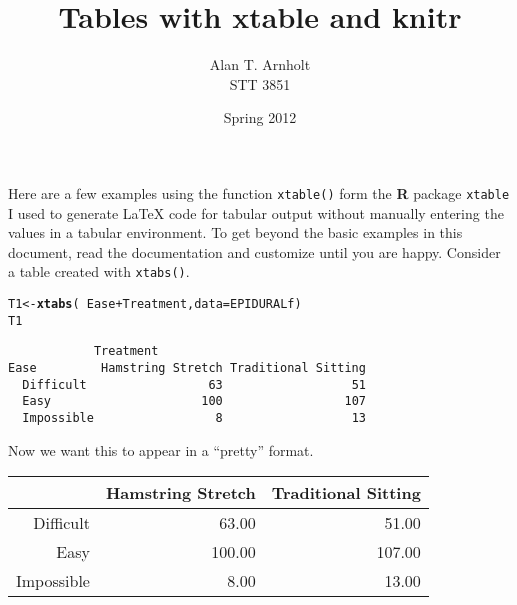 \documentclass[11pt]{article}\usepackage[]{graphicx}\usepackage[]{color}
\makeatletter
\newcommand{\hlopt}[1]{\textcolor[rgb]{0,0,0}{#1}}%
\newcommand{\hlstd}[1]{\textcolor[rgb]{0.345,0.345,0.345}{#1}}%
\newcommand{\hlkwb}[1]{\textcolor[rgb]{0.69,0.353,0.396}{#1}}%
\newcommand{\hlkwc}[1]{\textcolor[rgb]{0.333,0.667,0.333}{#1}}%
\newcommand{\hlkwd}[1]{\textcolor[rgb]{0.737,0.353,0.396}{\textbf{#1}}}%
\newenvironment{kframe}{%
 \def\at@end@of@kframe{}%
 \ifinner\ifhmode%
  \def\at@end@of@kframe{\end{minipage}}%
  \begin{minipage}{\columnwidth}%
 \fi\fi%
 \def\FrameCommand##1{\hskip\@totalleftmargin \hskip-\fboxsep
 \colorbox{shadecolor}{##1}\hskip-\fboxsep
     \hskip-\linewidth \hskip-\@totalleftmargin \hskip\columnwidth}%
 \MakeFramed {\advance\hsize-\width
   \@totalleftmargin\z@ \linewidth\hsize
   \@setminipage}}%
 {\par\unskip\endMakeFramed%
 \at@end@of@kframe}
\newenvironment{knitrout}{}{} %
\makeatother
\begin{document}



\title{Tables with \textbf{xtable} and \textbf{knitr}}
\author{Alan T. Arnholt\\ STT 3851}
\date{Spring 2012}
\maketitle



Here are a few examples using the function \texttt{xtable()} form the \textbf{R} package \texttt{xtable} I used to generate \LaTeX{} code for tabular output without manually entering the values in a tabular environment. To get beyond the basic examples in this document, read the documentation and customize until you are happy.  Consider a table created with \texttt{xtabs()}.

\begin{knitrout}
\color{fgcolor}\begin{kframe}
\begin{alltt}
\hlstd{T1} \hlkwb{<-} \hlkwd{xtabs}\hlstd{(}\hlopt{~} \hlstd{Ease} \hlopt{+} \hlstd{Treatment,} \hlkwc{data} \hlstd{= EPIDURALf)}
\hlstd{T1}
\end{alltt}
\begin{verbatim}
            Treatment
Ease         Hamstring Stretch Traditional Sitting
  Difficult                 63                  51
  Easy                     100                 107
  Impossible                 8                  13
\end{verbatim}
\end{kframe}
\end{knitrout}

Now we want this to appear in a ``pretty'' format.

\begin{table}[ht]
\centering
\begin{tabular}{rrr}
  \hline
 & Hamstring Stretch & Traditional Sitting \\ 
  \hline
Difficult & 63.00 & 51.00 \\ 
  Easy & 100.00 & 107.00 \\ 
  Impossible & 8.00 & 13.00 \\ 
   \hline
\end{tabular}
\end{table}
\end{document}
